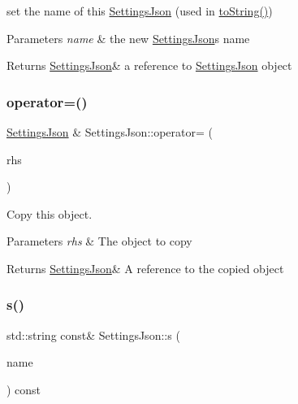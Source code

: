 set the name of this \hyperlink{class_settings_json}{Settings\+Json} (used in \hyperlink{class_settings_json_adf9b6991ed9896cc90455a016b5a9f29}{to\+String()}) 


\begin{DoxyParams}{Parameters}
{\em name} & the new \hyperlink{class_settings_json}{Settings\+Json}\textquotesingle{}s name \\
\hline
\end{DoxyParams}
\begin{DoxyReturn}{Returns}
\hyperlink{class_settings_json}{Settings\+Json}\& a reference to \hyperlink{class_settings_json}{Settings\+Json} object 
\end{DoxyReturn}
\mbox{\label{class_settings_json_aeacbc8e4b3c2ada35b2303d0ae1bf4b9}} 
\subsubsection{\texorpdfstring{operator=()}{operator=()}}
{\footnotesize\ttfamily \hyperlink{class_settings_json}{Settings\+Json} \& Settings\+Json\+::operator= (\begin{DoxyParamCaption}\item[{\hyperlink{class_settings_json}{Settings\+Json} const \&}]{rhs }\end{DoxyParamCaption})}



Copy this object. 


\begin{DoxyParams}{Parameters}
{\em rhs} & The object to copy \\
\hline
\end{DoxyParams}
\begin{DoxyReturn}{Returns}
\hyperlink{class_settings_json}{Settings\+Json}\& A reference to the copied object 
\end{DoxyReturn}
\mbox{\label{class_settings_json_af6e26eec97fdd26f1ec720bbfe4df5b9}} 
\subsubsection{\texorpdfstring{s()}{s()}\hspace{0.1cm}{\footnotesize\ttfamily [1/2]}}
{\footnotesize\ttfamily std\+::string const\& Settings\+Json\+::s (\begin{DoxyParamCaption}\item[{std\+::string const \&}]{name }\end{DoxyParamCaption}) const\hspace{0.3cm}{\ttfamily [inline]}}



